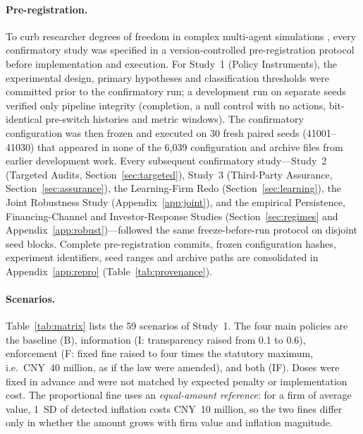 \documentclass[11pt]{article}
\begin{document}
\paragraph{Pre-registration.} To curb researcher degrees of freedom in complex multi-agent simulations \citep{olken2015promises}, every confirmatory study was specified in a version-controlled pre-registration protocol before implementation and execution. For Study~1 (Policy Instruments), the experimental design, primary hypotheses and classification thresholds were committed prior to the confirmatory run; a development run on separate seeds verified only pipeline integrity (completion, a null control with no actions, bit-identical pre-switch histories and metric windows). The confirmatory configuration was then frozen and executed on 30 fresh paired seeds (41001--41030) that appeared in none of the 6,039 configuration and archive files from earlier development work. Every subsequent confirmatory study---Study~2 (Targeted Audits, Section~\ref{sec:targeted}), Study~3 (Third-Party Assurance, Section~\ref{sec:assurance}), the Learning-Firm Redo (Section~\ref{sec:learning}), the Joint Robustness Study (Appendix~\ref{app:joint}), and the empirical Persistence, Financing-Channel and Investor-Response Studies (Section~\ref{sec:regimes} and Appendix~\ref{app:robust})---followed the same freeze-before-run protocol on disjoint seed blocks. Complete pre-registration commits, frozen configuration hashes, experiment identifiers, seed ranges and archive paths are consolidated in Appendix~\ref{app:repro} (Table~\ref{tab:provenance}).

\paragraph{Scenarios.} Table~\ref{tab:matrix} lists the 59 scenarios of Study~1. The four main policies are the baseline (B), information (I: transparency raised from 0.1 to 0.6), enforcement (F: fixed fine raised to four times the statutory maximum, i.e.\ CNY~40 million, as if the law were amended), and both (IF). Doses were fixed in advance and were not matched by expected penalty or implementation cost. The proportional fine uses an \emph{equal-amount reference}: for a firm of average value, 1~SD of detected inflation costs CNY~10 million, so the two fines differ only in whether the amount grows with firm value and inflation magnitude.
\end{document}
